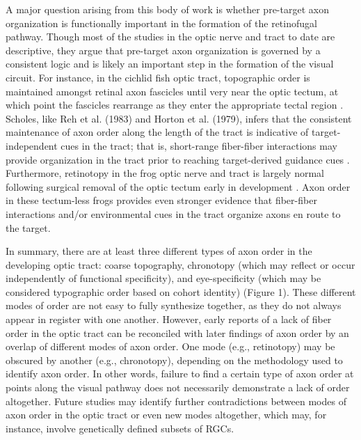 A major question arising from this body of work is whether pre-target axon organization is functionally important in the formation of the retinofugal pathway.
Though most of the studies in the optic nerve and tract to date are descriptive, they argue that pre-target axon organization is governed by a consistent logic and is likely an important step in the formation of the visual circuit.
For instance, in the cichlid fish optic tract, topographic order is maintained amongst retinal axon fascicles until very near the optic tectum, at which point the fascicles rearrange as they enter the appropriate tectal region \cite{scholes1979nerve}.
Scholes, like Reh et al. (1983) and Horton et al. (1979), infers that the consistent maintenance of axon order along the length of the tract is indicative of target-independent cues in the tract; that is, short-range fiber-fiber interactions may provide organization in the tract prior to reaching target-derived guidance cues \cite{scholes1979nerve}.
Furthermore, retinotopy in the frog optic nerve and tract is largely normal following surgical removal of the optic tectum early in development \cite{reh1983organization}.
Axon order in these tectum-less frogs provides even stronger evidence that fiber-fiber interactions and/or environmental cues in the tract organize axons en route to the target.

In summary, there are at least three different types of axon order in the developing optic tract: coarse topography, chronotopy (which may reflect or occur independently of functional specificity), and eye-specificity (which may be considered typographic order based on cohort identity) (Figure 1).
These different modes of order are not easy to fully synthesize together, as they do not always appear in register with one another.
However, early reports of a lack of fiber order in the optic tract \cite{horton1979non} can be reconciled with later findings of axon order by an overlap of different modes of axon order.
One mode (e.g., retinotopy) may be obscured by another (e.g., chronotopy), depending on the methodology used to identify axon order.
In other words, failure to find a certain type of axon order at points along the visual pathway does not necessarily demonstrate a lack of order altogether.
Future studies may identify further contradictions between modes of axon order in the optic tract or even new modes altogether, which may, for instance, involve genetically defined subsets of RGCs.
